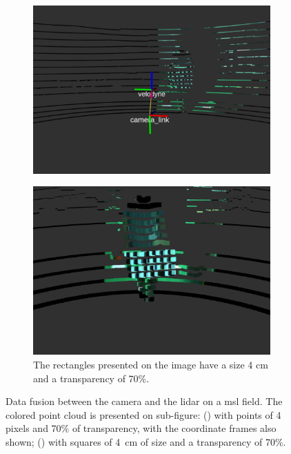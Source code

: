 \begin{figure}[!ht]
	\centering
	\begin{subfigure}[t]{0.45\textwidth}
		\includegraphics[width=\textwidth]{img/sensor_fusion/cambada_fusion_points.png}
		\caption{}
		\label{fig:sensor-fusion:cambada-points}
	\end{subfigure}
	\qquad
	\begin{subfigure}[t]{0.45\textwidth}
		\includegraphics[width=\textwidth]{img/sensor_fusion/cambada_fusion_squares.png}
		\caption{The rectangles presented on the image have a size 4 cm and a transparency of 70\%.}
		\label{fig:sensor-fusion:cambada-squares}
	\end{subfigure}
	\caption{Data fusion between the camera and the \ac{lidar} on a \ac{msl} field. The colored point cloud is presented on sub-figure: () with points of 4 pixels and 70\% of transparency, with the coordinate frames also shown; () with squares of \SI{4}{\centi\meter} of size and a transparency of 70\%.}
	\label{fig:cambada-sensor-fusion}
\end{figure}


